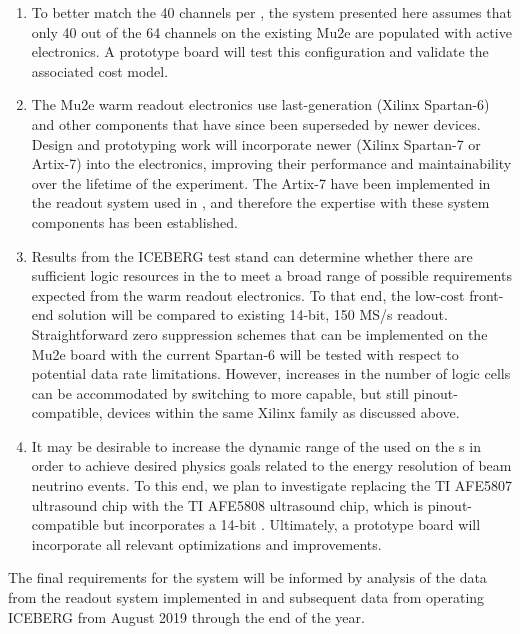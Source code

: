\begin{enumerate}
\item To better match the 40  channels per , the system presented here assumes that only 40 out of the 64 channels on the existing Mu2e  are populated with active electronics.  A prototype board will test this configuration and validate the associated cost model.

\item The Mu2e warm readout electronics use last-generation (Xilinx\texttrademark{} Spartan-6)  and other components that have since been superseded by newer devices.  Design and prototyping work will 
incorporate newer  (Xilinx Spartan-7 or Artix-7) into the electronics,
improving their performance and maintainability over the lifetime of the  experiment. The Artix-7  have been implemented in the  readout system used in , and therefore the expertise with these system components has been established. 

\item Results from the ICEBERG test stand can determine whether there are sufficient logic resources in the  to meet a broad range of possible  requirements expected from the warm readout electronics. To that end, the low-cost front-end solution will be compared to existing 14-bit, 150 MS/s  readout.  Straightforward zero suppression schemes that can be implemented on the Mu2e board with the current Spartan-6  will be tested with respect to potential  data rate limitations.  However, increases in the number of logic cells can be accommodated by switching to more capable, but still pinout-compatible, devices within the same Xilinx  family as discussed above.

\item It may be desirable to increase the dynamic range of the  used on the s in order to achieve desired physics goals related to the energy resolution of beam neutrino events.  To this end, we plan to investigate replacing the TI AFE5807 ultrasound chip with the TI AFE5808 ultrasound chip, which is pinout-compatible but incorporates a 14-bit .  Ultimately, a prototype board will incorporate all relevant optimizations and improvements.

\end{enumerate}

The final requirements for the system will be informed by analysis of the data from the readout system implemented in  and subsequent data from operating ICEBERG from August 2019 through the end of the year.

